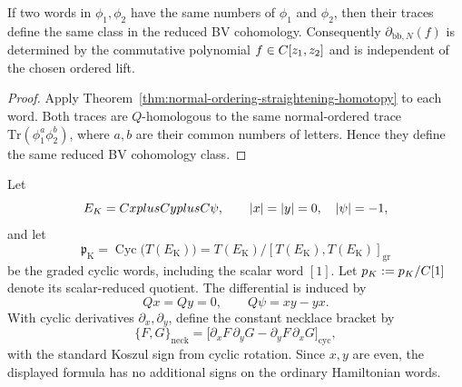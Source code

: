\documentclass[11pt]{memoir}
\begin{document}
\begin{cor}\label{cor:matrix-evaluation-well-defined}
  If two words in $\phi_1,\phi_2$ have the same numbers of $\phi_1$ and
  $\phi_2$, then their traces define the same class in the reduced BV
  cohomology. Consequently $\partial_{\mathrm{bb},N}(f)$ is determined by the
  commutative polynomial $f\in C[z_1,z_2]$ and is independent of the chosen
  ordered lift.
\end{cor}

\begin{proof}
  Apply Theorem~\ref{thm:normal-ordering-straightening-homotopy} to each
  word.  Both traces are \(Q\)-homologous to the same normal-ordered trace
  \(\mathrm{Tr}(\phi_1^a\phi_2^b)\), where \(a,b\) are their common numbers
  of letters.  Hence they define the same reduced BV cohomology class.
\end{proof}

\begin{defn}
\label{def:hamiltonian-cyclic-koszul-lie-model}
  Let
  \[
    E_{K}=C xplusC yplusC\psi,\qquad
    |x|=|y|=0,\quad |\psi|=-1,
  \]
  and let
	  \[
	    \mathfrak p_{\mathrm K}
	      =\operatorname{Cyc}\bigl(T(E_{\mathrm K})\bigr)
	      =T(E_{\mathrm K})/[T(E_{\mathrm K}),T(E_{\mathrm K})]_{\mathrm{gr}}
	  \]
	  be the graded cyclic words, including the scalar word \([1]\).  Let
	  \(p_{K}:=p_{K}/C[1]\)
	  denote its scalar-reduced quotient.  The differential is induced by
  \[
    Qx=Qy=0,\qquad Q\psi=xy-yx.
  \]
  With cyclic derivatives \(\partial_x,\partial_y\), define the constant
  necklace bracket by
  \[
    \{F,G\}_{\mathrm{neck}}
      =
      \bigl[\partial_xF\,\partial_yG-\partial_yF\,\partial_xG
      \bigr]_{\mathrm{cyc}},
  \]
  with the standard Koszul sign from cyclic rotation.  Since \(x,y\) are
  even, the displayed formula has no additional signs on the ordinary
  Hamiltonian words.
\end{defn}
\end{document}
